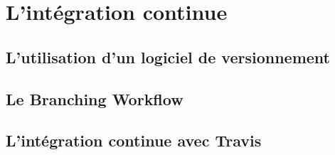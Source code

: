 \section{L'intégration continue}\label{integration-continue}
\subsection{L'utilisation d'un logiciel de versionnement}

\subsection{Le Branching Workflow}

\subsection{L'intégration continue avec Travis}
